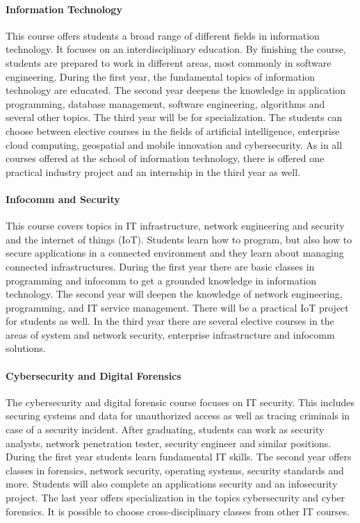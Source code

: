 \paragraph{Information Technology}
This course offers students a broad range of different fields in information technology. It focuses on an interdisciplinary education. By finishing the course, students are prepared to work in different areas, most commonly in software engineering. During the first year, the fundamental topics of information technology are educated. The second year deepens the knowledge in application programming, database management, software engineering, algorithms and several other topics. The third year will be for specialization. The students can choose between elective courses in the fields of artificial intelligence, enterprise cloud computing, geospatial and mobile innovation and cybersecurity. As in all courses offered at the school of information technology, there is offered one practical industry project and an internship in the third year as well.

\paragraph{Infocomm and Security}
This course covers topics in IT infrastructure, network engineering and security and the internet of things (IoT). Students learn how to program, but also how to secure applications in a connected environment and they learn about managing connected infrastructures. During the first year there are basic classes in programming and infocomm to get a grounded knowledge in information technology. The second year will deepen the knowledge of network engineering, programming, and IT service management. There will be a practical IoT project for students as well.
In the third year there are several elective courses in the areas of system and network security, enterprise infrastructure and infocomm solutions.

\paragraph{Cybersecurity and Digital Forensics}
The cybersecurity and digital forensic course focuses on IT security. This includes securing systems and data for unauthorized access as well as tracing criminals in case of a security incident. After graduating, students can work as security analysts, network penetration tester, security engineer and similar positions. During the first year students learn fundamental IT skills. The second year offers classes in forensics, network security, operating systems, security standards and more. Students will also complete an applications security and an infosecurity project.
The last year offers specialization in the topics cybersecurity  and cyber forensics. It is possible to choose cross-disciplinary classes from other IT courses.

